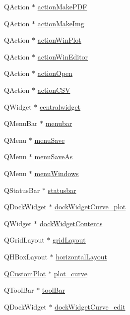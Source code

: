 \begin{DoxyCompactItemize}
\item 
Q\+Action $\ast$ \hyperlink{a00079_af013c084ff0ed9ae39a60aa7a39bdd91}{action\+Make\+P\+D\+F}
\item 
Q\+Action $\ast$ \hyperlink{a00079_a345313e538e5ef49cd27c1fc0bdd4173}{action\+Make\+Img}
\item 
Q\+Action $\ast$ \hyperlink{a00079_a0aeb289d8df9db6f4329e9000e44d511}{action\+Win\+Plot}
\item 
Q\+Action $\ast$ \hyperlink{a00079_aa5d56420958ab4fd1239e29714d75e18}{action\+Win\+Editor}
\item 
Q\+Action $\ast$ \hyperlink{a00079_a3ceb57268680eb23f6a3d522b303bb43}{action\+Open}
\item 
Q\+Action $\ast$ \hyperlink{a00079_afae3d61aac77b6c20a7953b3adba9672}{action\+C\+S\+V}
\item 
Q\+Widget $\ast$ \hyperlink{a00079_afff870ab422d2b873976067827089af1}{centralwidget}
\item 
Q\+Menu\+Bar $\ast$ \hyperlink{a00079_af09fe2fe1f34525f5caeb5ada7d297bf}{menubar}
\item 
Q\+Menu $\ast$ \hyperlink{a00079_a36a184d4c55f5de1b542257cbe23adaf}{menu\+Save}
\item 
Q\+Menu $\ast$ \hyperlink{a00079_a2568794cbc6cc9907104efbfd79eba7d}{menu\+Save\+As}
\item 
Q\+Menu $\ast$ \hyperlink{a00079_a0c7cba2d30d21689f48f1981e976c0b6}{menu\+Windows}
\item 
Q\+Status\+Bar $\ast$ \hyperlink{a00079_ab06a6e9bb964fc017cb9a246ee1f9ecb}{statusbar}
\item 
Q\+Dock\+Widget $\ast$ \hyperlink{a00079_a0edc87fb115fede171c0da1f99000874}{dock\+Widget\+Curve\+\_\+plot}
\item 
Q\+Widget $\ast$ \hyperlink{a00079_a78f9e81c1adc0092b7e4d6efb640dc43}{dock\+Widget\+Contents}
\item 
Q\+Grid\+Layout $\ast$ \hyperlink{a00079_ad06b82b83a9a74377d6ca44ae699f945}{grid\+Layout}
\item 
Q\+H\+Box\+Layout $\ast$ \hyperlink{a00079_ad3009fa6ef8958b3e052715beba75d28}{horizontal\+Layout}
\item 
\hyperlink{a00030_d8/d00/a00186}{Q\+Custom\+Plot} $\ast$ \hyperlink{a00079_a1d46308dee8db7e3c99af65f13055479}{plot\+\_\+curve}
\item 
Q\+Tool\+Bar $\ast$ \hyperlink{a00079_a884ecf47fc47f20bd60e9406b1ef88f1}{tool\+Bar}
\item 
Q\+Dock\+Widget $\ast$ \hyperlink{a00079_a83360bdd61e994537715aa7c38e4e5b6}{dock\+Widget\+Curve\+\_\+edit}

\end{DoxyCompactItemize}
